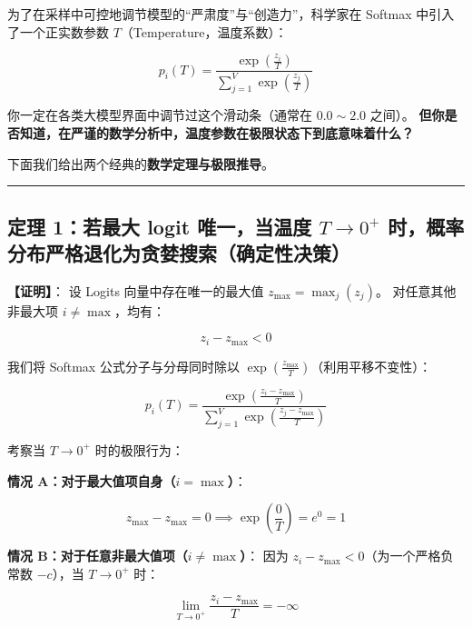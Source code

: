 为了在采样中可控地调节模型的“严肃度”与“创造力”，科学家在 Softmax 中引入了一个正实数参数 $T$（Temperature，温度系数）：

\[
p_i(T) = \frac{\exp\left(\frac{z_i}{T}\right)}{\sum_{j=1}^V \exp\left(\frac{z_j}{T}\right)}
\]

你一定在各类大模型界面中调节过这个滑动条（通常在 $0.0 \sim 2.0$ 之间）。
\textbf{但你是否知道，在严谨的数学分析中，温度参数在极限状态下到底意味着什么？}

下面我们给出两个经典的\textbf{数学定理与极限推导}。

\vspace{0.8em}\hrule\vspace{0.8em}

\subsection{定理 1：若最大 logit 唯一，当温度 $T \to 0^+$ 时，概率分布严格退化为贪婪搜索（确定性决策）}

\begin{mathBox}[核心数学定理推导]
\textbf{【证明】}：
设 Logits 向量中存在唯一的最大值 $z_{\max} = \max_j (z_j)$。
对任意其他非最大项 $i \neq \max$，均有：
\end{mathBox}

\[
z_i - z_{\max} < 0
\]

\begin{noteBox}[核心导读与背景]
我们将 Softmax 公式分子与分母同时除以 $\exp\left(\frac{z_{\max}}{T}\right)$（利用平移不变性）：
\end{noteBox}

\[
p_i(T) = \frac{\exp\left(\frac{z_i - z_{\max}}{T}\right)}{\sum_{j=1}^V \exp\left(\frac{z_j - z_{\max}}{T}\right)}
\]

\begin{noteBox}[核心导读与背景]
考察当 $T \to 0^+$ 时的极限行为：

\textbf{情况 A：对于最大值项自身（$i = \max$）}：
\end{noteBox}

\[
z_{\max} - z_{\max} = 0 \implies \exp\left(\frac{0}{T}\right) = e^0 = 1
\]

\begin{noteBox}[核心导读与背景]
\textbf{情况 B：对于任意非最大值项（$i \neq \max$）}：
因为 $z_i - z_{\max} < 0$（为一个严格负常数 $-c$），当 $T \to 0^+$ 时：
\end{noteBox}

\[
\lim_{T \to 0^+} \frac{z_i - z_{\max}}{T} = -\infty
\]

